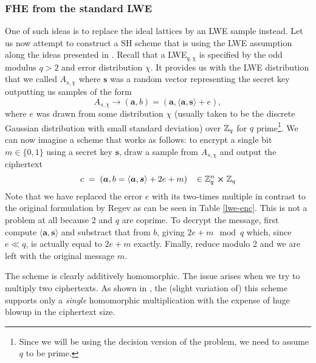 \subsubsection{FHE from the standard LWE}
 One of such ideas is to replace the ideal lattices by an LWE sample instead. Let us now attempt to construct a SH scheme that is using the LWE assumption along the ideas presented in \cite{fhe-lwe}. Recall that a LWE$_{q, \chi}$ is specified by the odd modulus $q > 2$ and error distribution $\chi$. It provides us with the LWE distribution that we called $A_{s, \chi}$ where $\bm{s}$ was a random vector representing the secret key outputting us samples of the form
\[A_{s, \chi} \rightarrow (\bm{a}, b) = (\bm{a}, \langle \bm{a}, \bm{s} \rangle + e),\]
where $e$ was drawn from some distribution $\chi$ (usually taken to be the discrete Gaussian distribution with small standard deviation) over $\mathbb{Z}_q$ for $q$ prime\footnote{Since we will be using the decision version of the problem, we need to assume $q$ to be prime.}. We can now imagine a scheme that works as follows: to encrypt a single bit $m \in \{0,1\}$ using a secret key $\bm{s}$, draw a sample from $A_{s, \chi}$ and output the ciphertext
\[ c \; = \; (\boldsymbol{a}, b = \langle \boldsymbol{a}, \boldsymbol{s} \rangle +2e +m) \; \; \; \in \mathbb{Z}_q^n \cross \mathbb{Z}_q \]
Note that we have replaced the error $e$ with its two-times multiple in contrast to the original formulation by Regev as can be seen in Table \ref{lwe-enc}. This is not a problem at all because 2 and $q$ are coprime. To decrypt the message, first compute $\langle \bm{a},\bm{s} \rangle$ and substract that from $b$, giving $2e + m \mod q$ which, since $e \ll q$, is actually equal to $2e +m$ exactly. Finally, reduce modulo 2 and we are left with the original message $m$.

The scheme is clearly additively homomorphic. The issue arises when we try to multiply two ciphertexts. As shown in \cite{one-mult}, the (slight variation of) this scheme supports only a \textit{single} homomorphic multiplication with the expense of huge blowup in the ciphertext size.

